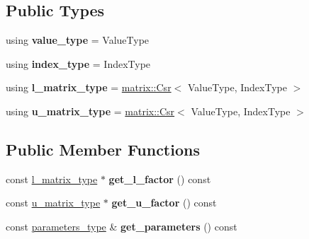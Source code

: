 \subsection*{Public Types}
\begin{DoxyCompactItemize}
\item 
\mbox{\label{classgko_1_1factorization_1_1ParIlu_acad8911da0088ca766a1cef155e5e405}} 
using {\bfseries value\+\_\+type} = Value\+Type
\item 
\mbox{\label{classgko_1_1factorization_1_1ParIlu_a261e5d91114bf308e98fc50141615618}} 
using {\bfseries index\+\_\+type} = Index\+Type
\item 
\mbox{\label{classgko_1_1factorization_1_1ParIlu_a125b96d5b1c81df5b2dd4479d8eb7854}} 
using {\bfseries l\+\_\+matrix\+\_\+type} = \hyperlink{classgko_1_1matrix_1_1Csr}{matrix\+::\+Csr}$<$ Value\+Type, Index\+Type $>$
\item 
\mbox{\label{classgko_1_1factorization_1_1ParIlu_a42829761e1a7a7713cbace50a8197811}} 
using {\bfseries u\+\_\+matrix\+\_\+type} = \hyperlink{classgko_1_1matrix_1_1Csr}{matrix\+::\+Csr}$<$ Value\+Type, Index\+Type $>$
\end{DoxyCompactItemize}
\subsection*{Public Member Functions}
\begin{DoxyCompactItemize}
\item 
\mbox{\label{classgko_1_1factorization_1_1ParIlu_aa892f3b0992ff41b0ce574c6595ddb1e}} 
const \hyperlink{classgko_1_1matrix_1_1Csr}{l\+\_\+matrix\+\_\+type} $\ast$ {\bfseries get\+\_\+l\+\_\+factor} () const
\item 
\mbox{\label{classgko_1_1factorization_1_1ParIlu_a6d228c5d73c81da44503459108b9504c}} 
const \hyperlink{classgko_1_1matrix_1_1Csr}{u\+\_\+matrix\+\_\+type} $\ast$ {\bfseries get\+\_\+u\+\_\+factor} () const
\item 
\mbox{\label{classgko_1_1factorization_1_1ParIlu_a1055caaa79b253fad67fa4e6d584c420}} 
const \hyperlink{structgko_1_1factorization_1_1ParIlu_1_1parameters__type}{parameters\+\_\+type} \& {\bfseries get\+\_\+parameters} () const
\end{DoxyCompactItemize}
